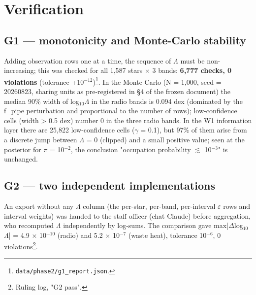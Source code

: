 \documentclass{aa}
\begin{document}
\section{Verification}

\subsection{G1 --- monotonicity and Monte-Carlo stability}
\noindent Adding observation rows one at a time, the sequence of \(\Lambda\) must be non-increasing; this was checked for all 1,587 stars \(\times\) 3 bands: \textbf{6,777 checks, 0 violations} (tolerance +10\(^{-12}\))\footnote{\texttt{data/phase2/g1\_report.json}.}. In the Monte Carlo (N = 1,000, seed = 20260823, sharing units as pre-registered in \S{}4 of the frozen document) the median 90\% width of log\(_{10}\)\(\Lambda\) in the radio bands is 0.094 dex (dominated by the f\_pipe perturbation and proportional to the number of rows); low-confidence cells (width > 0.5 dex) number 0 in the three radio bands. In the W1 information layer there are 25,822 low-confidence cells (\(\gamma\) = 0.1), but 97\% of them arise from a discrete jump between \(\Lambda\) = 0 (clipped) and a small positive value; seen at the posterior for \(\pi\) = 10\(^{-2}\), the conclusion "occupation probability \(\lesssim\) 10\(^{-3}\)" is unchanged.\par\smallskip


\subsection{G2 --- two independent implementations}
\noindent An export without any \(\Lambda\) column (the per-star, per-band, per-interval \(\varepsilon\) rows and interval weights) was handed to the staff officer (chat Claude) before aggregation, who recomputed \(\Lambda\) independently by log-sums. The comparison gave max|\(\Delta\)log\(_{10}\)\(\Lambda\)| = 4.9 \(\times\) 10\(^{-10}\) (radio) and 5.2 \(\times\) 10\(^{-7}\) (waste heat), tolerance 10\(^{-6}\), 0 violations\footnote{Ruling log, "G2 pass".}.\par\smallskip
\end{document}

